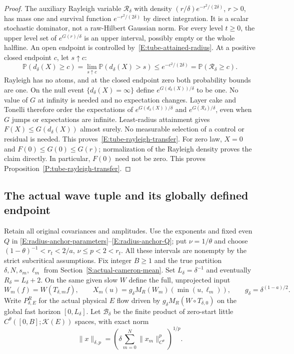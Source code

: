 \begin{proof}
  The auxiliary Rayleigh variable $\mathcal R_\delta$ with density
  $(r/\delta)e^{-r^2/(2\delta)}$, $r>0$, has mass one and
  survival function $e^{-r^2/(2\delta)}$ by direct integration.
  It is a scalar stochastic dominator, not a raw-Hilbert Gaussian norm.
  For every level $t\ge0$, the upper level set of $e^{G(r)/\delta}$
  is an upper interval, possibly empty or the whole halfline.
  An open endpoint is controlled by~\eqref{E:tube-attained-radius}.
  At a positive closed endpoint $c$, let $s\uparrow c$:
  \[
    \mathbb P(d_\delta(X)\ge c)
    =\lim_{s\uparrow c}\mathbb P(d_\delta(X)>s)
    \le e^{-c^2/(2\delta)}
    =\mathbb P(\mathcal R_\delta\ge c).
  \]
  Rayleigh has no atoms, and at the closed endpoint zero both
  probability bounds are one.
  On the null event $\{d_\delta(X)=\infty\}$ define
  $e^{G(d_\delta(X))/\delta}$ to be one. No value of $G$ at infinity
  is needed and no expectation changes.
  Layer cake and Tonelli therefore order the expectations of
  $e^{G(d_\delta(X))/\delta}$ and $e^{G(\mathcal R_\delta)/\delta}$,
  even when $G$ jumps or expectations are infinite.
  Least-radius attainment gives $F(X)\le G(d_\delta(X))$
  almost surely. No measurable selection of a control or residual is needed.
  This proves~\eqref{E:tube-rayleigh-transfer}.
  For zero law, $X=0$ and $F(0)\le G(0)\le G(r)$;
  normalization of the Rayleigh density proves the claim directly.
  In particular, $F(0)$ need not be zero.
  This proves Proposition~\ref{P:tube-rayleigh-transfer}.
\end{proof}

\subsection{The actual wave tuple and its globally defined endpoint}

Retain all original covariances and amplitudes.
Use the exponents and fixed even $Q$ in
\eqref{E:radius-anchor-parameters}--\eqref{E:radius-anchor-Q};
put $\nu=1/\theta$ and choose
$(1-\theta)^{-1}<r_t<2/a$, $\nu\le p<2<r_t$.
All these intervals are nonempty by the strict subcritical assumptions.
Fix integer $B\ge1$ and the true partition
$\delta,N,s_m,\ell_m$ from Section~\ref{S:actual-cameron-mean}.
Set $L_\delta=\delta^{-1}$ and eventually $R_\delta=L_\delta+2$.
On the same given slow $W$ define the full, unprojected input
\begin{equation}\label{E:tube-actual-input}
  W_m(f)=W(T_{\delta,m}f),\qquad
  X_m(u)=g_\delta M_R(W_m)(\min(u,\ell_m)),\qquad
  g_\delta=\delta^{(1-a)/2}.
\end{equation}
Write $P_{\delta,E}^R$ for the actual physical $E$ flow driven by
$g_\delta M_R(W\circ T_{\delta,0})$ on the global fast horizon $[0,L_\delta]$.
Let $\mathscr B_\delta$ be the finite product of zero-start
little $C^\theta([0,B];\mathcal K(E))$ spaces, with exact norm
\[
  \|x\|_{\delta,p}=\left(\delta\sum_{m=0}^N
  \|x_m\|_{C^\theta}^p\right)^{1/p}.
\]

